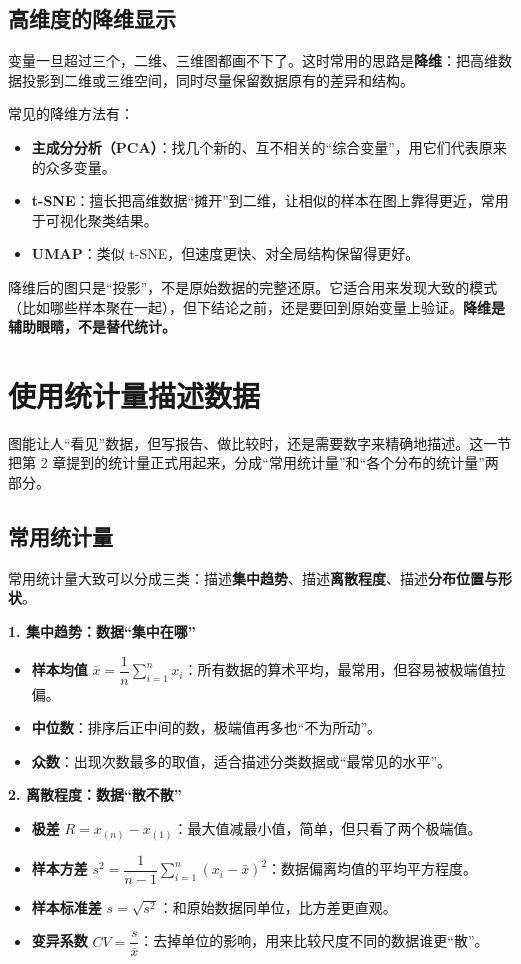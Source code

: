 \documentclass[lang=cn,10pt]{elegantbook}
\begin{document}
\subsection{高维度的降维显示}
变量一旦超过三个，二维、三维图都画不下了。这时常用的思路是\textbf{降维}：把高维数据投影到二维或三维空间，同时尽量保留数据原有的差异和结构。

常见的降维方法有：
\begin{itemize}
  \item \textbf{主成分分析（PCA）}：找几个新的、互不相关的“综合变量”，用它们代表原来的众多变量。
  \item \textbf{t-SNE}：擅长把高维数据“摊开”到二维，让相似的样本在图上靠得更近，常用于可视化聚类结果。
  \item \textbf{UMAP}：类似 t-SNE，但速度更快、对全局结构保留得更好。
\end{itemize}

\begin{remark}
降维后的图只是“投影”，不是原始数据的完整还原。它适合用来发现大致的模式（比如哪些样本聚在一起），但下结论之前，还是要回到原始变量上验证。\textbf{降维是辅助眼睛，不是替代统计。}
\end{remark}



\section{使用统计量描述数据}
图能让人“看见”数据，但写报告、做比较时，还是需要数字来精确地描述。这一节把第 2 章提到的统计量正式用起来，分成“常用统计量”和“各个分布的统计量”两部分。

\subsection{常用统计量}
常用统计量大致可以分成三类：描述\textbf{集中趋势}、描述\textbf{离散程度}、描述\textbf{分布位置与形状}。

\textbf{1. 集中趋势：数据“集中在哪”}
\begin{itemize}
  \item \textbf{样本均值} $\bar{x}=\dfrac{1}{n}\sum\limits_{i=1}^{n}x_i$：所有数据的算术平均，最常用，但容易被极端值拉偏。
  \item \textbf{中位数}：排序后正中间的数，极端值再多也“不为所动”。
  \item \textbf{众数}：出现次数最多的取值，适合描述分类数据或“最常见的水平”。
\end{itemize}

\textbf{2. 离散程度：数据“散不散”}
\begin{itemize}
  \item \textbf{极差} $R=x_{(n)}-x_{(1)}$：最大值减最小值，简单，但只看了两个极端值。
  \item \textbf{样本方差} $s^2=\dfrac{1}{n-1}\sum\limits_{i=1}^{n}(x_i-\bar{x})^2$：数据偏离均值的平均平方程度。
  \item \textbf{样本标准差} $s=\sqrt{s^2}$：和原始数据同单位，比方差更直观。
  \item \textbf{变异系数} $CV=\dfrac{s}{\bar{x}}$：去掉单位的影响，用来比较尺度不同的数据谁更“散”。
\end{itemize}
\end{document}

